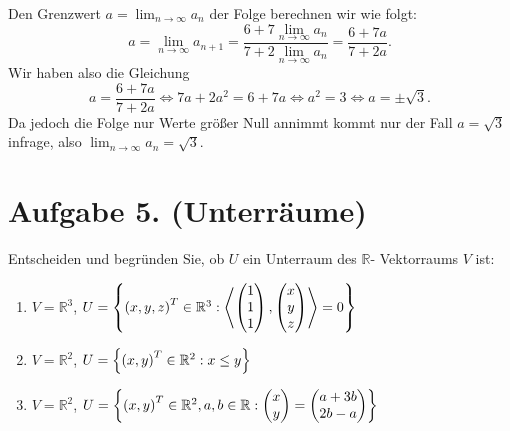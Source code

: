 \documentclass[german,12pt]{homework}
\newcommand{\RR}{\mathbb{R}}
\newcommand{\dotproduct}[2]{\left\langle#1, #2\right\rangle}
\DeclarePairedDelimiter{\enbrace}{(}{)}
\DeclarePairedDelimiter{\penbrace}{\{}{\}}
\begin{document}
\begin{enumerate}
        Den Grenzwert \(a = \lim_{n \to \infty}a_n\) der Folge berechnen wir
        wie folgt:
        \[a = \lim_{n \to \infty}a_{n + 1} = \frac{6 + 7\lim_{n \to
        \infty}a_n}{7 + 2\lim_{n \to \infty}a_n} = \frac{6 + 7a}{7 + 2a}.\]
        Wir haben also die Gleichung
        \[a = \frac{6 + 7a}{7 + 2a} \iff 7a + 2a^2 = 6 + 7a \iff a^2 = 3 \iff a
        = \pm\sqrt{3}.\]
        Da jedoch die Folge nur Werte größer Null annimmt kommt nur der Fall
        \(a = \sqrt{3}\) infrage, also \(\lim_{n \to \infty}a_n = \sqrt{3}\).
    \end{enumerate}

    \section*{Aufgabe 5. (Unterräume)}

    \begin{problem}
        Entscheiden und begründen Sie, ob \(U\) ein Unterraum des \(\RR\)-
        Vektorraums \(V\) ist:
        \begin{enumerate}
            \item \(V = \RR^3\), \quad \(U = \penbrace*{\enbrace*{x, y, z}^T
            \in \RR^3 :
            \dotproduct{\begin{pmatrix}1\\1\\1\end{pmatrix}}{\begin{pmatrix}x\\y
            \\z\end{pmatrix}} = 0}\)
            \item \(V = \RR^2\), \quad \(U = \penbrace*{\enbrace*{x, y}^T \in
            \RR^2 : x \le y}\)
            \item \(V = \RR^2\), \quad \(U = \penbrace*{\enbrace*{x, y}^T \in
            \RR^2, a, b \in \RR : \begin{pmatrix}x\\y\end{pmatrix} =
            \begin{pmatrix}a + 3b\\2b - a\end{pmatrix}}\)
        \end{enumerate}
    \end{problem}
\end{document}
